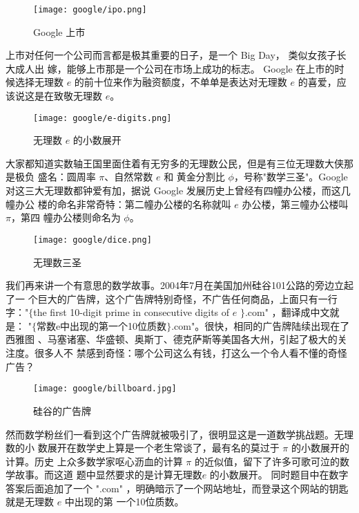 \begin{figure}[htbp]
\centering
\texttt{[image: google/ipo.png]}
\caption{Google 上市}
\centering
\end{figure}

上市对任何一个公司而言都是极其重要的日子，是一个 Big Day， 类似女孩子长大成人出
嫁，能够上市那是一个公司在市场上成功的标志。 Google 在上市的时候选择无理数 $e$
的前十位来作为融资额度，不单单是表达对无理数 $e$ 的喜爱，应该说这是在致敬无理数
$e$。

\begin{figure}[htbp]
\centering
\texttt{[image: google/e-digits.png]}
\caption{无理数 $e$ 的小数展开}
\centering
\end{figure}

大家都知道实数轴王国里面住着有无穷多的无理数公民，但是有三位无理数大侠那是极负
盛名：圆周率 $\pi$、自然常数 $e$ 和 黄金分割比 $\phi$，号称"数学三圣"。Google 
对这三大无理数都钟爱有加，据说 Google 发展历史上曾经有四幢办公楼，而这几幢办公
楼的命名非常奇特：第二幢办公楼的名称就叫 $e$ 办公楼，第三幢办公楼叫 $\pi$，第四
幢办公楼则命名为 $\phi$。

\begin{figure}[htbp]
\centering
\texttt{[image: google/dice.png]}
\caption{无理数三圣}
\centering
\end{figure}

我们再来讲一个有意思的数学故事。2004年7月在美国加州硅谷101公路的旁边立起了一
个巨大的广告牌，这个广告牌特别奇怪，不广告任何商品，上面只有一行字："$\{$the
first 10-digit prime in consecutive digits of $e$ $\}$.com" ，翻译成中文就是：
"$\{$常数e中出现的第一个10位质数$\}$.com"。很快，相同的广告牌陆续出现在了西雅图
、马塞诸塞、华盛顿、奥斯丁、德克萨斯等美国各大州，引起了极大的关注度。很多人不
禁感到奇怪：哪个公司这么有钱，打这么一个令人看不懂的奇怪广告？

\begin{figure}[htbp]
\centering
\texttt{[image: google/billboard.jpg]}
\caption{硅谷的广告牌}
\centering
\end{figure}

然而数学粉丝们一看到这个广告牌就被吸引了，很明显这是一道数学挑战题。无理数的小
数展开在数学史上算是一个老生常谈了，最有名的莫过于 $\pi$ 的小数展开的计算。历史
上众多数学家呕心沥血的计算 $\pi$ 的近似值，留下了许多可歌可泣的数学故事。而这道
题中显然要求的是计算无理数$e$ 的小数展开。 同时题目中在数字答案后面追加了一个
".com" ，明确暗示了一个网站地址，而登录这个网站的钥匙就是无理数 $e$ 中出现的第
一个10位质数。

